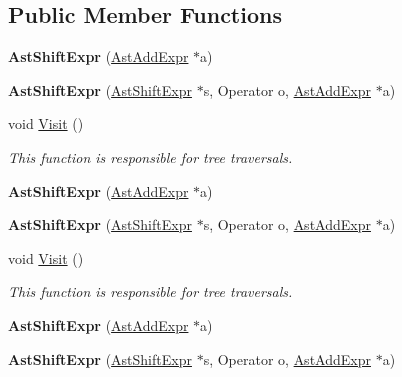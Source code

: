 \subsection*{Public Member Functions}
\begin{DoxyCompactItemize}
\item 
\hypertarget{classAstShiftExpr_ae85c464914cce70d3ebb4f51b898781f}{{\bfseries Ast\-Shift\-Expr} (\hyperlink{classAstAddExpr}{Ast\-Add\-Expr} $\ast$a)}\label{classAstShiftExpr_ae85c464914cce70d3ebb4f51b898781f}

\item 
\hypertarget{classAstShiftExpr_a9c8c73a11d9e4da6264b1d83d4339cdb}{{\bfseries Ast\-Shift\-Expr} (\hyperlink{classAstShiftExpr}{Ast\-Shift\-Expr} $\ast$s, Operator o, \hyperlink{classAstAddExpr}{Ast\-Add\-Expr} $\ast$a)}\label{classAstShiftExpr_a9c8c73a11d9e4da6264b1d83d4339cdb}

\item 
void \hyperlink{classAstShiftExpr_ae20f0c9604ec1ca74911337e3ed375e5}{Visit} ()
\begin{DoxyCompactList}\small\item\em This function is responsible for tree traversals. \end{DoxyCompactList}\item 
\hypertarget{classAstShiftExpr_ae85c464914cce70d3ebb4f51b898781f}{{\bfseries Ast\-Shift\-Expr} (\hyperlink{classAstAddExpr}{Ast\-Add\-Expr} $\ast$a)}\label{classAstShiftExpr_ae85c464914cce70d3ebb4f51b898781f}

\item 
\hypertarget{classAstShiftExpr_a9c8c73a11d9e4da6264b1d83d4339cdb}{{\bfseries Ast\-Shift\-Expr} (\hyperlink{classAstShiftExpr}{Ast\-Shift\-Expr} $\ast$s, Operator o, \hyperlink{classAstAddExpr}{Ast\-Add\-Expr} $\ast$a)}\label{classAstShiftExpr_a9c8c73a11d9e4da6264b1d83d4339cdb}

\item 
void \hyperlink{classAstShiftExpr_ae20f0c9604ec1ca74911337e3ed375e5}{Visit} ()
\begin{DoxyCompactList}\small\item\em This function is responsible for tree traversals. \end{DoxyCompactList}\item 
\hypertarget{classAstShiftExpr_ae85c464914cce70d3ebb4f51b898781f}{{\bfseries Ast\-Shift\-Expr} (\hyperlink{classAstAddExpr}{Ast\-Add\-Expr} $\ast$a)}\label{classAstShiftExpr_ae85c464914cce70d3ebb4f51b898781f}

\item 
\hypertarget{classAstShiftExpr_a9c8c73a11d9e4da6264b1d83d4339cdb}{{\bfseries Ast\-Shift\-Expr} (\hyperlink{classAstShiftExpr}{Ast\-Shift\-Expr} $\ast$s, Operator o, \hyperlink{classAstAddExpr}{Ast\-Add\-Expr} $\ast$a)}\label{classAstShiftExpr_a9c8c73a11d9e4da6264b1d83d4339cdb}


\end{DoxyCompactItemize}
